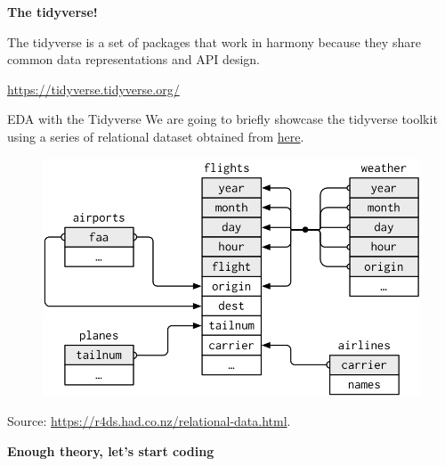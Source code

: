 \documentclass[
hyperref={bookmarks=false},
xcolor={dvipsnames,svgnames*,x11names*}, 
12pt
]{beamer}
\begin{document}
\begin{frame}
\vspace{2cm}
\begin{center}
\Huge
\textbf{The tidyverse!}
\end{center}
\vspace{1.5cm}
\epigraph{The tidyverse is a set of packages that work in harmony because they share common data representations and API design.}{\url{https://tidyverse.tidyverse.org/}}
\end{frame}

\begin{frame}{EDA with the Tidyverse}
\vspace{-0.5cm}
We are going to briefly showcase the tidyverse toolkit using a series of relational dataset obtained from \href{https://www.data.gov.uk/dataset/cb7ae6f0-4be6-4935-9277-47e5ce24a11f/road-safety-data}{here}.
\begin{figure}
\centering
\includegraphics[width=0.8\linewidth]{figures/relational-nycflights.png}
\end{figure}
{\small Source: \url{https://r4ds.had.co.nz/relational-data.html}.}
\end{frame}

\begin{frame}
\vspace{2cm}
\begin{center}
\Huge
\textbf{Enough theory, let's start coding }
\end{center}
\end{frame}
\end{document}
